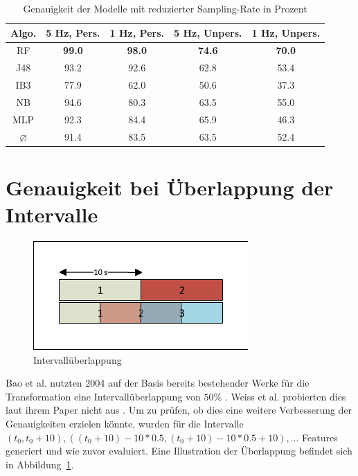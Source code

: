\begin{table}
\centering
\begin{tabular}{|c|c|c||c|c|}
	\hline 
	\textbf{Algo.} & \textbf{5 Hz, Pers.} & \textbf{1 Hz, Pers.} &\textbf{5 Hz, Unpers.} & \textbf{1 Hz, Unpers.} \\ 
	\hline 
	\acs{RF} & \textbf{99.0} & \textbf{98.0} & \textbf{74.6} & \textbf{70.0} \\ 
	\acs{J48} & 93.2 & 92.6 & 62.8 & 53.4 \\ 
	\acs{IB}3 & 77.9 & 62.0 & 50.6 & 37.3 \\ 
	\acs{NB} & 94.6 & 80.3 & 63.5 & 55.0 \\ 
	\acs{MLP} & 92.3 & 84.4 & 65.9 & 46.3 \\ 
	\hline 
	$\varnothing$ & 91.4 & 83.5 & 63.5 & 52.4 \\ 
	\hline
\end{tabular} 
\caption{Genauigkeit der Modelle mit reduzierter Sampling-Rate in Prozent}
\label{tab:accuracy-sampling_rate}
\end{table}

\section{Genauigkeit bei Überlappung der Intervalle}
\begin{figure}[htb]
\centering
\includegraphics[clip=true, trim=5mm 5mm 5mm 5mm]{img/interval_overlap}
\caption{Intervallüberlappung}
\label{fig:interval-overlap}
\end{figure}

Bao et al. nutzten 2004 auf der Basis bereits bestehender Werke für die Transformation eine Intervallüberlappung von $50 \%$ \cite{Bao2004}. Weiss et al. probierten dies laut ihrem Paper nicht aus \cite{Weiss2016}. Um zu prüfen, ob dies eine weitere Verbesserung der Genauigkeiten erzielen könnte, wurden für die Intervalle $(t_0, t_0 + 10), ((t_0 + 10) - 10 * 0.5, (t_0 + 10) - 10 * 0.5 + 10), ...$ Features generiert und wie zuvor evaluiert. Eine Illustration der Überlappung befindet sich in Abbildung~\ref{fig:interval-overlap}.

